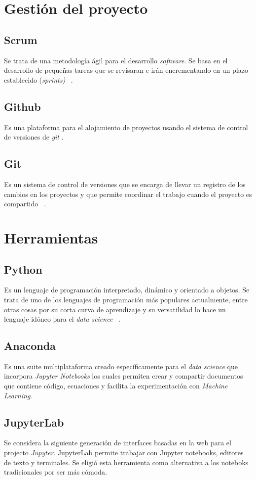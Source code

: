 
\section{Gestión del proyecto}
\subsection{Scrum}
Se trata de una metodología ágil para el desarrollo \emph{software}. Se basa en el desarrollo de pequeñas tareas que se revisaran e irán encrementando en un plazo establecido (\emph{sprints)} ~\cite{wiki:scrum}.
\subsection{Github}
Es una plataforma para el alojamiento de proyectos usando el sistema de control de versiones de \emph{git} .
\subsection{Git}
Es un sistema de control de versiones que se encarga de llevar un registro de los cambios en los proyectos y que permite coordinar el trabajo cuando el proyecto es compartido ~\cite{wiki:git}.

\section{Herramientas}
\subsection{Python}
Es un lenguaje de programación interpretado, dinámico y orientado a objetos. Se trata de uno de los lenguajes de programación más populares actualmente, entre otras cosas por su corta curva de aprendizaje y su versatilidad lo hace un lenguaje idóneo para el \emph{data science} ~\cite{wiki:python}.

\subsection{Anaconda}
Es una suite multiplataforma creado específicamente para el \emph{data science} que incorpora \emph{Jupyter Notebooks} los cuales permiten crear y compartir documentos que contiene código, ecuaciones y facilita la experimentación con \emph{Machine Learning}.
\subsection{JupyterLab}
Se considera la siguiente generación de interfaces basadas en la web para el projecto \emph{Jupyter}. JupyterLab permite trabajar con Jupyter notebooks, editores de texto y terminales. Se eligió esta herramienta como alternativa a los noteboks tradicionales por ser más cómoda.

